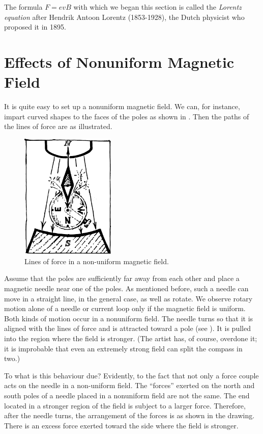 The formula $F=evB$ with which we began this section is called the \emph{Lorentz equation} after Hendrik Antoon Lorentz (1853-1928), the Dutch physicist who proposed it in 1895.

\section{Effects of Nonuniform Magnetic Field}

It is quite easy to set up a nonuniform magnetic field. We can, for instance, impart curved shapes to the faces of the poles as shown in . Then the paths of the lines of force are as illustrated.

\begin{figure}[!ht]
\centering
\includegraphics[width=0.4\textwidth]{figures/fig-03-05.pdf}
\caption{Lines of force in a non-uniform magnetic field.}
\label{fig-3.5}
\end{figure}

Assume that the poles are sufficiently far away from each other and place a magnetic needle near one of the poles. As mentioned before, such a needle can move in a straight line, in the general case, as well as rotate. We observe rotary motion alone of a needle or current loop only if the magnetic field is uniform. Both kinds of motion occur in a nonuniform field. The needle turns so that it is aligned with the lines of force and is attracted toward a pole (see ). It is pulled into the region where the field is stronger. (The artist has, of course, overdone it; it is improbable that even an extremely strong field can split the compass in two.)

To what is this behaviour due? Evidently, to the fact that not only a force couple acts on the needle in a non-uniform field. The ``forces'' exerted on the north and south poles of a needle placed in a nonuniform field are not the same. The end located in a stronger region of the field is subject to a larger force. Therefore, after the needle turns, the arrangement of the forces is as shown in the drawing. There is an excess force exerted toward the side where the field is stronger.

